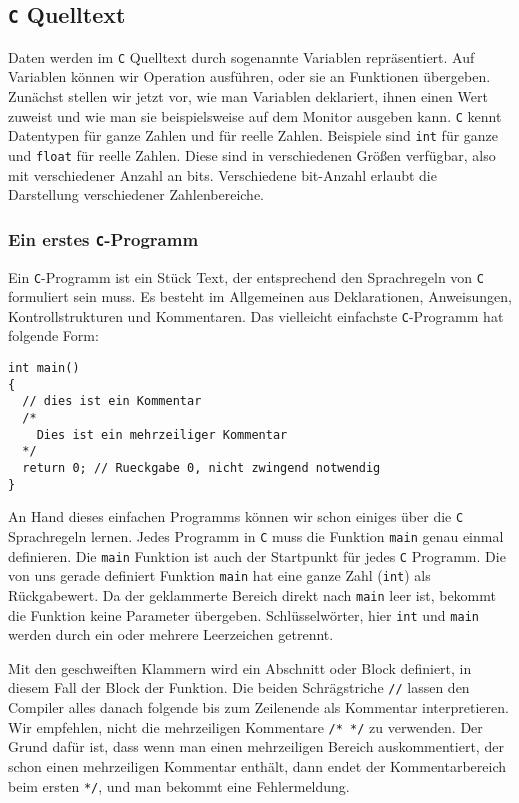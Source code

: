 \subsection{\texttt{C} Quelltext}

Daten werden im \texttt{C} Quelltext durch sogenannte Variablen repräsentiert. 
Auf Variablen können wir Operation ausführen, oder sie an Funktionen übergeben.
Zunächst stellen wir jetzt vor, wie man Variablen deklariert, ihnen einen Wert zuweist und wie man sie beispielsweise auf dem Monitor ausgeben kann.
\texttt{C} kennt Datentypen für ganze Zahlen und für reelle Zahlen.
Beispiele sind \texttt{int} für ganze und \texttt{float} für reelle Zahlen.
Diese sind in verschiedenen Größen verfügbar, also mit verschiedener Anzahl an bits.
Verschiedene bit-Anzahl erlaubt die Darstellung verschiedener Zahlenbereiche.

\subsubsection{Ein erstes \texttt{C}-Programm}

Ein \texttt{C}-Programm ist ein Stück Text, der entsprechend den Sprachregeln von \texttt{C} formuliert sein muss.
Es besteht im Allgemeinen aus Deklarationen, Anweisungen, Kontrollstrukturen und Kommentaren.
Das vielleicht einfachste \texttt{C}-Programm hat folgende Form:
\begin{lstlisting}[caption={Ein erstes \texttt{C}-Programm}, belowcaptionskip=0.3em]
int main()
{
  // dies ist ein Kommentar
  /*
    Dies ist ein mehrzeiliger Kommentar
  */
  return 0; // Rueckgabe 0, nicht zwingend notwendig
}
\end{lstlisting}
An Hand dieses einfachen Programms können wir schon einiges über die \texttt{C} Sprachregeln lernen.
Jedes Programm in \texttt{C} muss die Funktion \texttt{main} genau einmal definieren. 
Die \texttt{main} Funktion ist auch der Startpunkt für jedes \texttt{C} Programm.
Die von uns gerade definiert Funktion \texttt{main} hat eine ganze Zahl (\texttt{int}) als Rückgabewert.
Da der geklammerte Bereich direkt nach \texttt{main} leer ist, bekommt die Funktion keine Parameter übergeben.
Schlüsselwörter, hier \texttt{int} und \texttt{main} werden durch ein oder mehrere Leerzeichen getrennt.

Mit den geschweiften Klammern wird ein Abschnitt oder Block definiert, in diesem Fall der Block der Funktion.
Die beiden Schrägstriche \texttt{//} lassen den Compiler alles danach folgende bis zum Zeilenende als Kommentar interpretieren.
Wir empfehlen, nicht die mehrzeiligen Kommentare \texttt{/* */} zu verwenden.
Der Grund dafür ist, dass wenn man einen mehrzeiligen Bereich auskommentiert, der schon einen mehrzeiligen Kommentar enthält, dann endet der Kommentarbereich beim ersten \texttt{*/}, und man bekommt eine Fehlermeldung.

